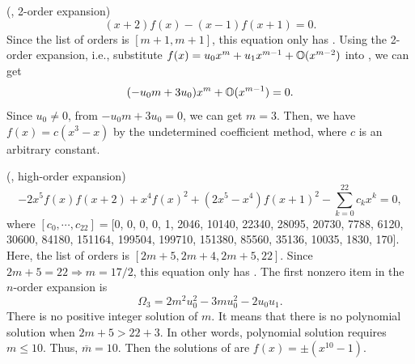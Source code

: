 \begin{example}
(\BPthree{}, 2-order expansion)
\begin{equation}
(x+2)f(x)-(x-1)f(x+1)=0. \label{ep3}
\end{equation}
Since the list of orders is $[m+1,m+1]$, this equation only has \BPthree{}. Using the 2-order expansion, i.e., substitute $f(x)=u_0 x^m + u_1 x^{m-1} + \mathbb O(x^{m-2})$ into , we can get
\begin{equation}
(-u_0 m+3u_0)x^m+\mathbb O(x^{m-1})=0.
\end{equation}
Since $u_0\neq 0$, from $-u_0 m+3u_0=0$, we can get $m=3$. Then, we have $f(x)=c(x^3-x)$ by the undetermined coefficient method, where $c$ is an arbitrary constant.
\end{example}

\begin{example}
(\BPthree{}, high-order expansion)
\begin{equation}
-2x^5f(x)f(x+2)+x^4f(x)^2+(2x^5-x^4)f(x+1)^2-\sum_{k=0}^{22}{c_k x^k}=0, \label{ep4}
\end{equation}
where $[c_0,\cdots,c_{22}]=$[0, 0, 0, 0, 1, 2046, 10140, 22340, 28095, 20730, 7788, 6120, 30600, 84180, 151164, 199504, 199710, 151380, 85560, 35136, 10035, 1830, 170]. Here, the list of orders is $[2m+5,2m+4,2m+5,22]$. Since $2m+5=22\Rightarrow m=17/2$, this equation only has \BPthree{}. The first nonzero item in the $n$-order expansion is
\begin{equation}
\Omega_3 = 2m^2u_0^2-3mu_0^2-2u_0u_1.
\end{equation}
There is no positive integer solution of $m$. It means that there is no polynomial solution when $2m+5 > 22+3$. In other words, polynomial solution requires $m\le 10$. Thus, $\overline m =10$. Then the solutions of  are $f(x)=\pm (x^{10}-1)$.
\end{example}

